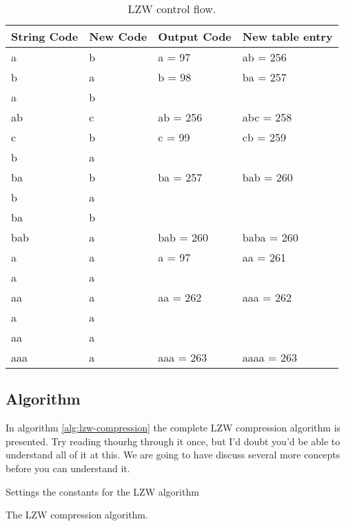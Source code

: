 \begin{refsection}
\begin{table}
  \centering
  \newcommand{\lzwrow}[4]{#1 & #2 & #3 & #4 \\}
  \begin{tabular}{llll}
    \toprule
    String Code & New Code & Output Code & New table entry \\
    \midrule

    \lzwrow{a}{b}{a = 97}{ab = 256}
    \lzwrow{b}{a}{b = 98}{ba = 257}
    \lzwrow{a}{b}{}{}
    \lzwrow{ab}{c}{ab = 256}{abc = 258}
    \lzwrow{c}{b}{c = 99}{cb = 259}
    \lzwrow{b}{a}{}{}
    \lzwrow{ba}{b}{ba = 257}{bab = 260}
    \lzwrow{b}{a}{}{}
    \lzwrow{ba}{b}{}{}
    \lzwrow{bab}{a}{bab = 260}{baba = 260}
    \lzwrow{a}{a}{a = 97}{aa = 261}
    \lzwrow{a}{a}{}{}
    \lzwrow{aa}{a}{aa = 262}{aaa = 262}
    \lzwrow{a}{a}{}{}
    \lzwrow{aa}{a}{}{}
    \lzwrow{aaa}{a}{aaa = 263}{aaaa = 263}

    \bottomrule
  \end{tabular}
  \caption{LZW control flow.}
  \label{tab:lzw-walkthru}
\end{table}

\subsection{Algorithm}

In algorithm \ref{alg:lzw-compression} the complete LZW compression
algorithm is presented. Try reading thourhg through it once, but I'd
doubt you'd be able to understand all of it at this. We are going to
have discuss several more concepts before you can understand it.

\begin{algorithm}[H]
  \caption{Settings the constants for the LZW algorithm}
  \label{alg:lzw-constants}
  \begin{algorithmic}[1]
  \end{algorithmic}
\end{algorithm}

\begin{algorithm}[H]
  \caption{The LZW compression algorithm.}
  \label{alg:lzw-compression}
  \begin{algorithmic}[1]
    \EndFor




\end{algorithmic}
\end{algorithm}
\end{refsection}
